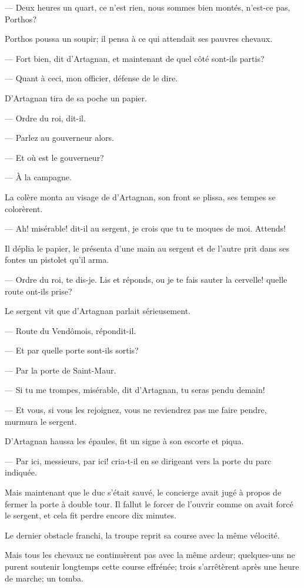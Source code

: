 — Deux heures un quart, ce n'est rien, nous sommes bien montés, n'est-ce pas, Porthos?

Porthos poussa un soupir; il pensa à ce qui attendait ses pauvres chevaux.

— Fort bien, dit d'Artagnan, et maintenant de quel côté sont-ils partis?

— Quant à ceci, mon officier, défense de le dire.

D'Artagnan tira de sa poche un papier.

— Ordre du roi, dit-il.

— Parlez au gouverneur alors.

— Et où est le gouverneur?

— À la campagne.

La colère monta au visage de d'Artagnan, son front se plissa, ses tempes se colorèrent.

— Ah! misérable! dit-il au sergent, je crois que tu te moques de moi. Attends!

Il déplia le papier, le présenta d'une main au sergent et de l'autre prit dans ses fontes un pistolet qu'il arma.

— Ordre du roi, te dis-je. Lis et réponds, ou je te fais sauter la cervelle! quelle route ont-ils prise?

Le sergent vit que d'Artagnan parlait sérieusement.

— Route du Vendômois, répondit-il.

— Et par quelle porte sont-ils sortis?

— Par la porte de Saint-Maur.

— Si tu me trompes, misérable, dit d'Artagnan, tu seras pendu demain!

— Et vous, si vous les rejoignez, vous ne reviendrez pas me faire pendre, murmura le sergent.

D'Artagnan haussa les épaules, fit un signe à son escorte et piqua.

— Par ici, messieurs, par ici! cria-t-il en se dirigeant vers la porte du parc indiquée.

Mais maintenant que le duc s'était sauvé, le concierge avait jugé à propos de fermer la porte à double tour. Il fallut le forcer de l'ouvrir comme on avait forcé le sergent, et cela fit perdre encore dix minutes.

Le dernier obstacle franchi, la troupe reprit sa course avec la même vélocité.

Mais tous les chevaux ne continuèrent pas avec la même ardeur; quelques-uns ne purent soutenir longtemps cette course effrénée; trois s'arrêtèrent après une heure de marche; un tomba.


